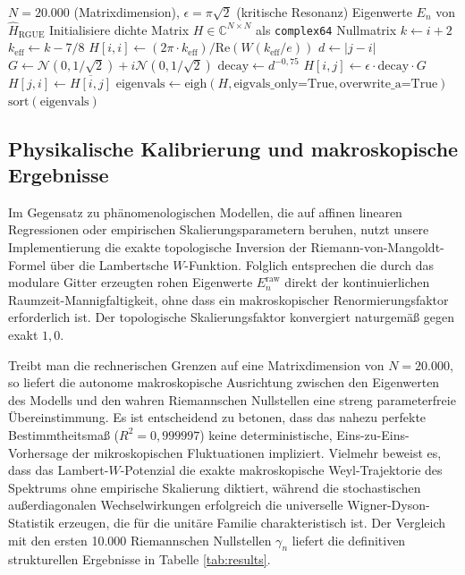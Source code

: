 \documentclass[aps,prl,preprint,superscriptaddress,floatfix]{revtex4-2}
\begin{document}
\begin{algorithm}[H]
\caption{Parameterfreie Generierung des Riemann-GUE-Ensembles}
\label{alg:hamiltonian}
\begin{algorithmic}[1]
\Require $N=20.000$ (Matrixdimension), $\epsilon=\pi\sqrt{2}$ (kritische Resonanz)
\Ensure Eigenwerte $E_n$ von $\hat{H}_{\text{RGUE}}$
\State Initialisiere dichte Matrix $H \in \mathbb{C}^{N \times N}$ als \texttt{complex64} Nullmatrix
    \State $k \gets i+2$
    \State $k_{\text{eff}} \gets k - 7/8$ 
    \State $H[i,i] \gets (2\pi \cdot k_{\text{eff}}) / \text{Re}(W(k_{\text{eff}}/e))$ 
        \State $d \gets |j-i|$
         
            \State $G \gets \mathcal{N}(0, 1/\sqrt{2}) + i\mathcal{N}(0, 1/\sqrt{2})$ 
            \State $\text{decay} \gets d^{-0,75}$ 
            \State $H[i,j] \gets \epsilon \cdot \text{decay} \cdot G$
            \State $H[j,i] \gets \overline{H[i,j]}$ 
        \EndIf
    \EndFor
\EndFor
\State $\text{eigenvals} \gets \text{eigh}(H, \text{eigvals\_only=True}, \text{overwrite\_a=True})$
\State \Return $\text{sort}(\text{eigenvals})$
\end{algorithmic}
\end{algorithm}

\subsection{Physikalische Kalibrierung und makroskopische Ergebnisse}
Im Gegensatz zu phänomenologischen Modellen, die auf affinen linearen Regressionen oder empirischen Skalierungsparametern beruhen, nutzt unsere Implementierung die exakte topologische Inversion der Riemann-von-Mangoldt-Formel über die Lambertsche $W$-Funktion. Folglich entsprechen die durch das modulare Gitter erzeugten rohen Eigenwerte $E_n^{\text{raw}}$ direkt der kontinuierlichen Raumzeit-Mannigfaltigkeit, ohne dass ein makroskopischer Renormierungsfaktor erforderlich ist. Der topologische Skalierungsfaktor konvergiert naturgemäß gegen exakt $1,0$.

Treibt man die rechnerischen Grenzen auf eine Matrixdimension von $N=20.000$, so liefert die autonome makroskopische Ausrichtung zwischen den Eigenwerten des Modells und den wahren Riemannschen Nullstellen eine streng parameterfreie Übereinstimmung. Es ist entscheidend zu betonen, dass das nahezu perfekte Bestimmtheitsmaß ($R^2 = 0,999997$) keine deterministische, Eins-zu-Eins-Vorhersage der mikroskopischen Fluktuationen impliziert. Vielmehr beweist es, dass das Lambert-$W$-Potenzial die exakte makroskopische Weyl-Trajektorie des Spektrums ohne empirische Skalierung diktiert, während die stochastischen außerdiagonalen Wechselwirkungen erfolgreich die universelle Wigner-Dyson-Statistik erzeugen, die für die unitäre Familie charakteristisch ist. Der Vergleich mit den ersten 10.000 Riemannschen Nullstellen $\gamma_n$ liefert die definitiven strukturellen Ergebnisse in Tabelle \ref{tab:results}.
\end{document}
